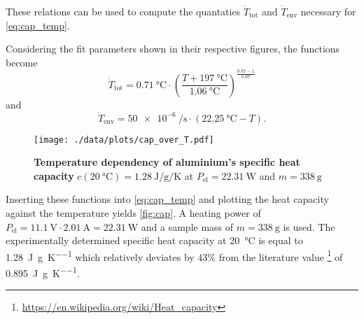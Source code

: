 These relations can be used to compute the quantaties $\dot{T}_\text{tot}$ and $\dot{T}_\text{env}$ necessary for \autoref{eq:cap_temp}.

Considering the fit parameters shown in their respective figures, the functions become
\begin{equation*}
	\dot{T}_\text{tot} = \SI{0.71}{\celsius}\cdot\left(\frac{T+\SI{197}{\celsius}}{\SI{1.06}{\celsius}}\right)^{\frac{0.67-1}{0.67}}
\end{equation*}
and
\begin{equation*}
	\dot{T}_\text{env} = \SI{50e-6}{\per\second}\cdot(\SI{22.25}{\celsius}-T).
\end{equation*}

\begin{figure}[tbp]
	\centering
	\texttt{[image: ./data/plots/cap\_over\_T.pdf]}
	\caption[Temperature dependency of aluminium's specific heat capacity]{\textbf{Temperature dependency of aluminium's specific heat capacity} $c(\SI{20}{\celsius})=\SI{1.28}{\joule\per\gram\per\kelvin}$ at $P_\text{el}=\SI{22.31}{\watt}$ and $m=\SI{338}{\gram}$}
	\label{fig:cap}
\end{figure}
Inserting these functions into \autoref{eq:cap_temp} and plotting the heat capacity against the temperature yields \autoref{fig:cap}.
A heating power of $P_\text{el}=\SI{11.1}{\volt}\cdot\SI{2.01}{\ampere} = \SI{22.31}{\watt}$ and a sample mass of $m=\SI{338}{\gram}$ is used.
The experimentally determined specific heat capacity at \SI{20}{\celsius} is equal to \SI{1.28}{\joule\per\gram\per\kelvin} which relatively deviates by \num{43}\% from the literature value \footnote{\url{https://en.wikipedia.org/wiki/Heat_capacity}} of \SI{0.895}{\joule\per\gram\per\kelvin}.
